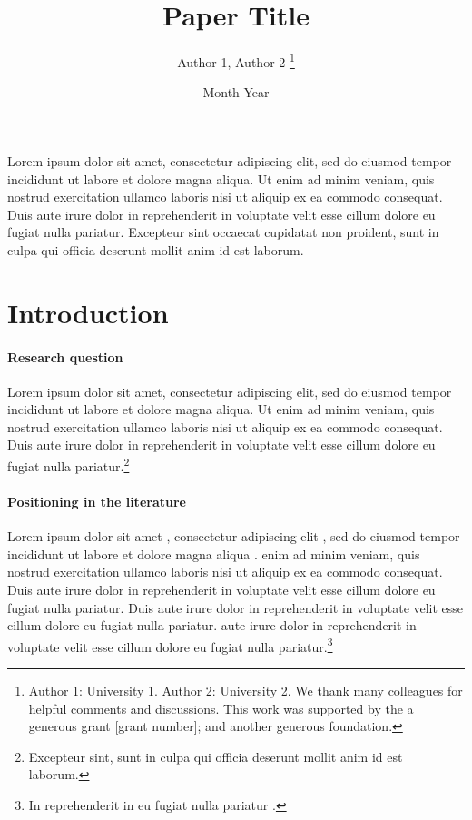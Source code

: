 \documentclass[letterpaper,12pt,leqno]{article}
\begin{document}
\title{Paper Title}
\author{Author 1, Author 2
\thanks{Author 1: University 1. Author 2: University 2. We thank many colleagues for helpful comments and discussions. This work was supported by the a generous grant [grant number]; and another generous foundation.}}
\date{Month Year}                       

\begin{titlepage}\maketitle

Lorem ipsum dolor sit amet, consectetur adipiscing elit, sed do eiusmod tempor incididunt ut labore et dolore magna aliqua. Ut enim ad minim veniam, quis nostrud exercitation ullamco laboris nisi ut aliquip ex ea commodo consequat. Duis aute irure dolor in reprehenderit in voluptate velit esse cillum dolore eu fugiat nulla pariatur. Excepteur sint occaecat cupidatat non proident, sunt in culpa qui officia deserunt mollit anim id est laborum.

\end{titlepage}\section{Introduction}\label{s:introduction}
 
\paragraph{Research question} Lorem ipsum dolor sit amet, consectetur adipiscing elit, sed do eiusmod tempor incididunt ut labore et dolore magna aliqua. Ut enim ad minim veniam, quis nostrud exercitation ullamco laboris nisi ut aliquip ex ea commodo consequat. Duis aute irure dolor in reprehenderit in voluptate velit esse cillum dolore eu fugiat nulla pariatur.\footnote{Excepteur sint, sunt in culpa qui officia deserunt mollit anim id est laborum.}

\paragraph{Positioning in the literature} Lorem ipsum dolor sit amet \citep{MS15}, consectetur adipiscing elit \citep[p. 1305]{MS19}, sed do eiusmod tempor incididunt ut labore et dolore magna aliqua . \citet{M12,M14} enim ad minim veniam, quis nostrud exercitation ullamco laboris nisi ut aliquip ex ea commodo consequat. Duis aute irure dolor in reprehenderit in voluptate velit esse cillum dolore eu fugiat nulla pariatur.  Duis aute irure dolor in reprehenderit in voluptate velit esse cillum dolore eu fugiat nulla pariatur. \citeauthor{EMM21} aute irure dolor in reprehenderit in voluptate velit esse cillum dolore eu fugiat nulla pariatur.\footnote{In reprehenderit in eu fugiat nulla pariatur \citep{LMS18a}.}
\end{document}
